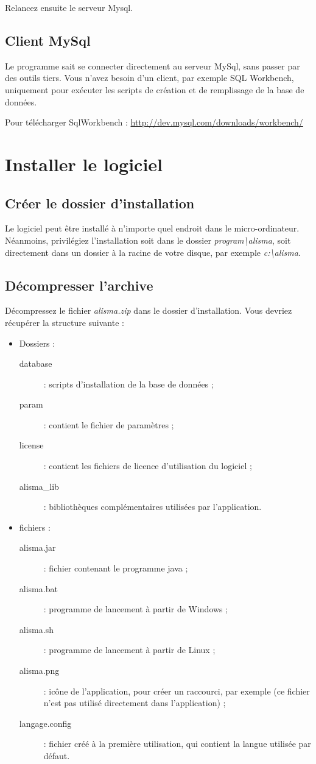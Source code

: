 Relancez ensuite le serveur Mysql.

\subsection{Client MySql}
Le programme sait se connecter directement au serveur MySql, sans passer par des outils tiers. Vous n'avez besoin d'un client, par exemple SQL Workbench, uniquement pour exécuter les scripts de création et de remplissage de la base de données.

Pour télécharger SqlWorkbench : \url{http://dev.mysql.com/downloads/workbench/}


\section{Installer le logiciel}
\subsection{Créer le dossier d'installation}

Le logiciel peut être installé à n'importe quel endroit dans le micro-ordinateur. Néanmoins, privilégiez l'installation soit dans le dossier \textit{program\textbackslash alisma}, soit directement dans un dossier à la racine de votre disque, par exemple \textit{c:\textbackslash alisma}.

\subsection{Décompresser l'archive}
Décompressez le fichier \textit{alisma.zip} dans le dossier d'installation. Vous devriez récupérer la structure suivante :

\begin{itemize}
\item Dossiers :
\begin{description}
\item[database] : scripts d'installation de la base de données ;
\item[param] : contient le fichier de paramètres ;
\item[license] : contient les fichiers de licence d'utilisation du logiciel ;
\item[alisma\_lib] : bibliothèques complémentaires utilisées par l'application.
\end{description}
\item fichiers :
\begin{description}
\item[alisma.jar] : fichier contenant le programme java ;
\item[alisma.bat] : programme de lancement à partir de Windows ;
\item[alisma.sh] : programme de lancement à partir de Linux ;
\item[alisma.png] : icône de l'application, pour créer un raccourci, par exemple (ce fichier n'est pas utilisé directement dans l'application) ;
\item[langage.config] : fichier créé à la première utilisation, qui contient la langue utilisée par défaut.
\end{description}
\end{itemize}

